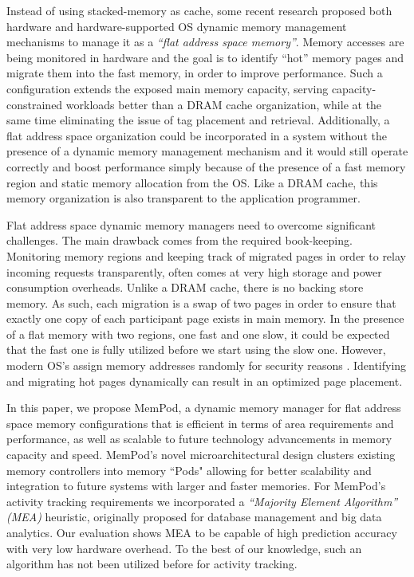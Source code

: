 Instead of using stacked-memory as cache, some recent research \cite{sim-micro2014,meswani-HPCA21,CAMEO} proposed both hardware and hardware-supported OS dynamic memory management mechanisms to manage it as a \emph{``flat address space memory''}. Memory accesses are being monitored in hardware and the goal is to identify ``hot'' memory pages and migrate them into the fast memory, in order to improve performance. Such a configuration extends the exposed main memory capacity, serving capacity-constrained workloads better than a DRAM cache organization, while at the same time eliminating the issue of tag placement and retrieval. Additionally, a flat address space organization could be incorporated in a system without the presence of a dynamic memory management mechanism and it would still operate correctly and boost performance simply because of the presence of a fast memory region and static memory allocation from the OS. Like a DRAM cache, this memory organization is also transparent to the application programmer.

Flat address space dynamic memory managers need to overcome significant challenges. The main drawback comes from the required book-keeping. Monitoring memory regions and keeping track of migrated pages in order to relay incoming requests transparently, often comes at very high storage and power consumption overheads. Unlike a DRAM cache, there is no backing store memory. As such, each migration is a swap of two pages in order to ensure that exactly one copy of each participant page exists in main memory. In the presence of a flat memory with two regions, one fast and one slow, it could be expected that the fast one is fully utilized before we start using the slow one. However, modern OS's assign memory addresses randomly for security reasons . Identifying and migrating hot pages dynamically can result in an optimized page placement.


In this paper, we propose MemPod, a dynamic memory manager for flat address space memory configurations that is efficient in terms of area requirements and performance, as well as scalable to future technology advancements in memory capacity and speed. MemPod's novel microarchitectural design clusters existing memory controllers into memory ``Pods" allowing for better scalability and integration to future systems with larger and faster memories. For MemPod's activity tracking requirements we incorporated a \emph{``Majority Element Algorithm'' (MEA)} heuristic, originally proposed for database management and big data analytics. Our evaluation shows MEA to be capable of high prediction accuracy with very low hardware overhead. To the best of our knowledge, such an algorithm has not been utilized before for activity tracking.

